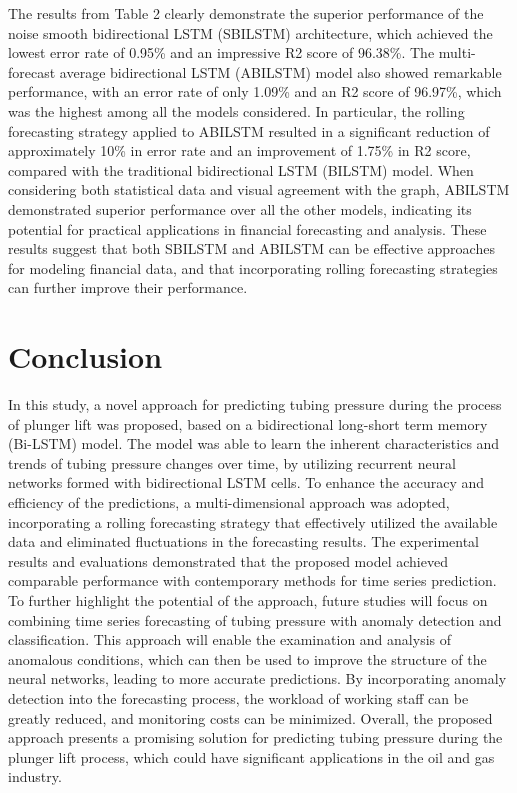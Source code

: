 \documentclass[sn-mathphys,Numbered]{sn-jnl}%
\theoremstyle{thmstyleone}%
\theoremstyle{thmstyletwo}%
\theoremstyle{thmstylethree}%
\begin{document}
The results from Table 2 clearly demonstrate the superior performance of the noise smooth bidirectional LSTM (SBILSTM) architecture, which achieved the lowest error rate of 0.95\% and an impressive R2 score of 96.38\%. The multi-forecast average bidirectional LSTM (ABILSTM) model also showed remarkable performance, with an error rate of only 1.09\% and an R2 score of 96.97\%, which was the highest among all the models considered. In particular, the rolling forecasting strategy applied to ABILSTM resulted in a significant reduction of approximately 10\% in error rate and an improvement of 1.75\% in R2 score, compared with the traditional bidirectional LSTM (BILSTM) model. When considering both statistical data and visual agreement with the graph, ABILSTM demonstrated superior performance over all the other models, indicating its potential for practical applications in financial forecasting and analysis. These results suggest that both SBILSTM and ABILSTM can be effective approaches for modeling financial data, and that incorporating rolling forecasting strategies can further improve their performance.

\section{Conclusion}\label{sec5}

In this study, a novel approach for predicting tubing pressure during the process of plunger lift was proposed, based on a bidirectional long-short term memory (Bi-LSTM) model. The model was able to learn the inherent characteristics and trends of tubing pressure changes over time, by utilizing recurrent neural networks formed with bidirectional LSTM cells. To enhance the accuracy and efficiency of the predictions, a multi-dimensional approach was adopted, incorporating a rolling forecasting strategy that effectively utilized the available data and eliminated fluctuations in the forecasting results. The experimental results and evaluations demonstrated that the proposed model achieved comparable performance with contemporary methods for time series prediction. To further highlight the potential of the approach, future studies will focus on combining time series forecasting of tubing pressure with anomaly detection and classification. This approach will enable the examination and analysis of anomalous conditions, which can then be used to improve the structure of the neural networks, leading to more accurate predictions. By incorporating anomaly detection into the forecasting process, the workload of working staff can be greatly reduced, and monitoring costs can be minimized. Overall, the proposed approach presents a promising solution for predicting tubing pressure during the plunger lift process, which could have significant applications in the oil and gas industry.
\end{document}
